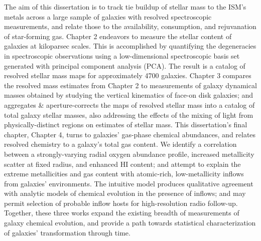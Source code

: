 The aim of this dissertation is to track tie buildup of stellar mass to the ISM's metals across a large sample of galaxies with resolved spectroscopic measurements, and relate those to the availability, consumption, and rejuvanation of star-forming gas. Chapter 2 endeavors to measure the stellar content of galaxies at kiloparsec scales. 
This is accomplished by quantifying the degeneracies in spectroscopic observations using a low-dimensional spectroscopic basis set generated with principal component analysis (PCA). The result is a catalog of resolved stellar mass maps for approximately 4700 galaxies. Chapter 3 compares the resolved mass estimates from Chapter 2 to measurements of galaxy dynamical masses obtained by studying the vertical kinematics of face-on disk galaxies; and aggregates \& aperture-corrects the maps of resolved stellar mass into a catalog of total galaxy stellar masses, also addressing the effects of the mixing of light from physically-distinct regions on estimates of stellar mass. This dissertation's final chapter, Chapter 4, turns to galaxies' gas-phase chemical abundances, and relates resolved chemistry to a galaxy's total gas content. We identify a correlation between a strongly-varying radial oxygen abundance profile, increased metallicity scatter at fixed radius, and enhanced HI content; and attempt to explain the extreme metallicities and gas content with atomic-rich, low-metallicity inflows from galaxies' environments. The intuitive model produces qualitative agreement with analytic models of chemical evolution in the presence of inflows; and may permit selection of probable inflow hosts for high-resolution radio follow-up. Together, these three works expand the existing breadth of measurements of galaxy chemical evolution, and provide a path towards statistical characterization of galaxies' transformation through time.


{}


